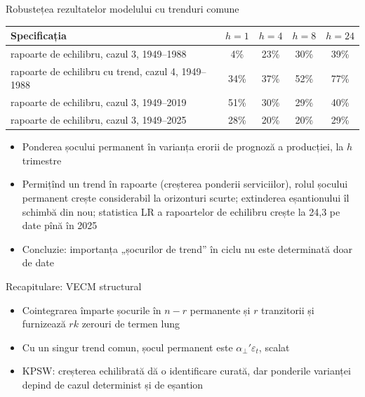 \begin{frame}{Robustețea rezultatelor modelului cu trenduri comune}
\itemsize{\small}
\begin{center}
\footnotesize
\begin{tabular}{lcccc}
\toprule
\textbf{Specificația} & $h = 1$ & $h = 4$ & $h = 8$ & $h = 24$ \\
\midrule
rapoarte de echilibru, cazul 3, 1949--1988 & 4\% & 23\% & 30\% & 39\% \\
rapoarte de echilibru cu trend, cazul 4, 1949--1988 & 34\% & 37\% & 52\% & 77\% \\
rapoarte de echilibru, cazul 3, 1949--2019 & 51\% & 30\% & 29\% & 40\% \\
rapoarte de echilibru, cazul 3, 1949--2025 & 28\% & 20\% & 20\% & 29\% \\
\bottomrule
\end{tabular}
\end{center}
\begin{itemize}
    \item Ponderea șocului permanent în varianța erorii de prognoză a producției, la $h$ trimestre
    \item Permițînd un trend în rapoarte (creșterea ponderii serviciilor), rolul șocului permanent crește considerabil la orizonturi scurte; extinderea eșantionului îl schimbă din nou; statistica LR a rapoartelor de echilibru crește la 24{,}3 pe date pînă în 2025
    \item Concluzie: importanța „șocurilor de trend” în ciclu nu este determinată doar de date
\end{itemize}
\end{frame}

\begin{frame}{Recapitulare: VECM structural}
\itemsize{\small}
\begin{itemize}
    \item Cointegrarea împarte șocurile în $n - r$ permanente și $r$ tranzitorii și furnizează $rk$ zerouri de termen lung
    \item Cu un singur trend comun, șocul permanent este $\alpha_\perp'\varepsilon_t$, scalat
    \item KPSW: creșterea echilibrată dă o identificare curată, dar ponderile varianței depind de cazul determinist și de eșantion
\end{itemize}
\end{frame}


